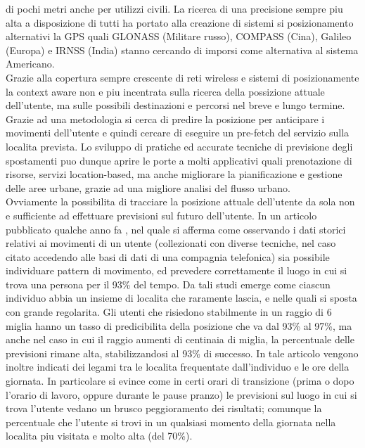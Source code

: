 di pochi metri anche per utilizzi civili. La ricerca di una precisione sempre
piu alta a disposizione di tutti ha portato alla creazione di sistemi si posizionamento
alternativi la GPS quali GLONASS (Militare russo), COMPASS (Cina), Galileo (Europa) e IRNSS (India)
stanno cercando di imporsi come alternativa al sistema Americano.\\
Grazie alla copertura sempre crescente di reti wireless e sistemi di posizionamente la
context aware non e piu incentrata sulla ricerca della possizione attuale dell'utente, ma sulle possibili destinazioni
e percorsi nel breve e lungo termine. Grazie ad una metodologia si cerca di predire la posizione
per anticipare i movimenti dell'utente e quindi cercare di eseguire un pre-fetch
del servizio sulla localita prevista.
Lo sviluppo di pratiche ed accurate tecniche di previsione degli spostamenti
puo dunque aprire le porte a molti applicativi quali prenotazione di risorse,
servizi location-based, ma anche migliorare la pianificazione e gestione delle
aree urbane, grazie ad una migliore analisi del flusso urbano.\\
Ovviamente la possibilita di tracciare la posizione attuale dell'utente da sola non e sufficiente
ad effettuare previsioni sul futuro dell'utente. In un articolo pubblicato qualche anno fa
 \cite{new_1}, nel quale si afferma come osservando i dati storici relativi ai movimenti di un utente
(collezionati con diverse tecniche, nel caso citato accedendo alle basi di dati di una compagnia telefonica)
sia possibile individuare pattern di movimento, ed prevedere correttamente il luogo in cui
si trova una persona per il 93\% del tempo. Da tali studi emerge come ciascun
individuo abbia un insieme di localita che raramente lascia, e nelle quali si
sposta con grande regolarita. Gli utenti che risiedono stabilmente in un raggio
di 6 miglia hanno un tasso di predicibilita della posizione che va dal 93\% al
97\%, ma anche nel caso in cui il raggio aumenti di centinaia di miglia, la
percentuale delle previsioni rimane alta, stabilizzandosi al 93\% di successo.
In tale articolo vengono inoltre indicati dei legami tra le localita frequentate
dall'individuo e le ore della giornata. In particolare si evince come in
certi orari di transizione (prima o dopo l'orario di lavoro, oppure durante le
pause pranzo) le previsioni sul luogo in cui si trova l'utente vedano un brusco
peggioramento dei risultati; comunque la percentuale che l'utente si trovi in
un qualsiasi momento della giornata nella localita piu visitata e molto alta (del
70\%).

